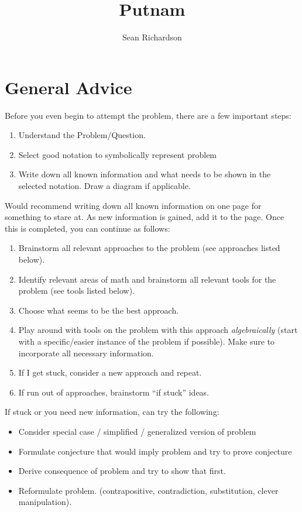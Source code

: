 \documentclass[12pt]{amsart}
\theoremstyle{definition}
\begin{document}
\title{Putnam}
\author{Sean Richardson}
\maketitle

\section{General Advice}

Before you even begin to attempt the problem, there are a few important
steps:
\begin{enumerate}
    \item Understand the Problem/Question.
    \item Select good notation to symbolically represent problem
    \item Write down all known information and what needs to be shown in the
        selected notation. Draw a diagram if applicable.
\end{enumerate}

Would recommend writing down all known information on one page for
something to stare at. As new information is gained, add it to the page.
Once this is completed, you can continue as follows:

\begin{enumerate}[resume]
    \item Brainstorm all relevant approaches to the problem (see approaches
        listed below).
    \item Identify relevant areas of math and brainstorm all relevant tools
    for the problem (see tools listed below).
    \item Choose what seems to be the best approach.
    \item Play around with tools on the problem with this approach
    \emph{algebraically} (start
    with a specific/easier instance of the problem if possible). Make
    sure to incorporate all necessary information.
    \item If I get stuck, consider a new approach and repeat.
    \item If run out of approaches, brainstorm ``if stuck'' ideas.    
\end{enumerate}

If stuck or you need new information, can try the following:
\begin{itemize}
    \item Consider special case / simplified / generalized version of problem
    \item Formulate conjecture that would imply problem and try to prove
        conjecture
    \item Derive consequence of problem and try to show that first.
    \item Reformulate problem. (contrapositive, contradiction,
        substitution, clever manipulation).
\end{itemize}
\end{document}
